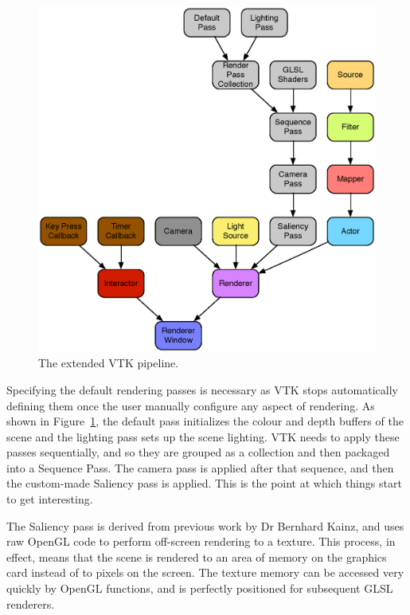 \documentclass[MSc,paper=a4,pagesize=auto]{icldt}
\begin{document}
\begin{figure}[htbp!]
    \centering
    \includegraphics[width=1\textwidth]{resources/vtk_extended_pipeline}
    \caption{The extended VTK pipeline.}
    \label{fig:vtk_extended_pipeline}
\end{figure}

Specifying the default rendering passes is necessary as VTK stops automatically defining them once the user manually configure any aspect of rendering. As shown in Figure~\ref{fig:vtk_extended_pipeline}, the default pass initializes the colour and depth buffers of the scene and the lighting pass sets up the scene lighting. VTK needs to apply these passes sequentially, and so they are grouped as a collection and then packaged into a Sequence Pass. The camera pass is applied after that sequence, and then the custom-made Saliency pass is applied. This is the point at which things start to get interesting.

The Saliency pass is derived from previous work by Dr Bernhard Kainz, and uses raw OpenGL code to perform off-screen rendering to a texture. This process, in effect, means that the scene is rendered to an area of memory on the graphics card instead of to pixels on the screen. The texture memory can be accessed very quickly by OpenGL functions, and is perfectly positioned for subsequent GLSL renderers.
\end{document}
